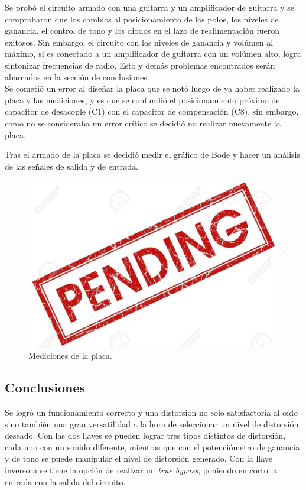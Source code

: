 Se probó el circuito armado con una guitarra y un amplificador de guitarra y se comprobaron que los cambios al posicionamiento de los polos, los niveles de ganancia, el control de tono y los diodos en el lazo de realimentación fueron exitosos. Sin embargo, el circuito con los niveles de ganancia y volúmen al máximo, si es conectado a un amplificador de guitarra con un volúmen alto, logra sintonizar frecuencias de radio. Esto y demás problemas encontrados serán abarcados en la sección de conclusiones. \\

Se cometió un error al diseñar la placa que se notó luego de ya haber realizado la placa y las mediciones, y es que se confundió el posicionamiento próximo del capacitor de desacople (C1) con el capacitor de compensación (C8), sin embargo, como no se consideraba un error crítico se decidió no realizar nuevamente la placa.

Tras el armado de la placa se decidió medir el gráfico de Bode y hacer un análisis de las señales de salida y de entrada.

\begin{figure}[H]
	\centering
	\includegraphics[width=1\textwidth, trim={0 0 0 0}, clip]{ImagenesAux/pend.jpg}
	\caption{Mediciones de la placa.}
	\label{fig:sim_prop_tran}
\end{figure}

\subsection{Conclusiones}

Se logró un funcionamiento correcto y una distorsión no solo satisfactoria al oído sino también una gran versatilidad a la hora de seleccionar un nivel de distorsión deseado. Con las dos llaves se pueden lograr tres tipos distintos de distorsión, cada uno con un sonido diferente, mientras que con el potenciómetro de ganancia y de tono se puede manipular el nivel de distorsión generado. Con la llave inversora se tiene la opción de realizar un \textit{true bypass}, poniendo en corto la entrada con la salida del circuito.

